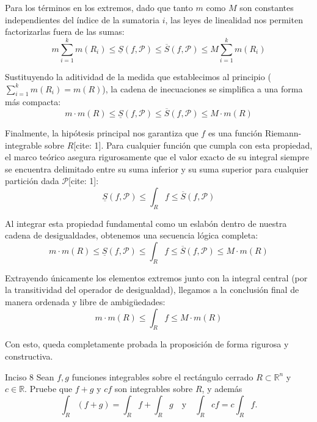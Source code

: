 \documentclass[11pt,letterpaper]{article}
\begin{document}
Para los términos en los extremos, dado que tanto $m$ como $M$ son constantes independientes del índice de la sumatoria $i$, las leyes de linealidad nos permiten factorizarlas fuera de las sumas:
\begin{equation*}
m \sum_{i=1}^{k} m(R_{i}) \le \underline{S}(f,\mathcal{P}) \le \overline{S}(f,\mathcal{P}) \le M \sum_{i=1}^{k} m(R_{i})
\end{equation*}

Sustituyendo la aditividad de la medida que establecimos al principio ($\sum_{i=1}^{k} m(R_{i}) = m(R)$), la cadena de inecuaciones se simplifica a una forma más compacta:
\begin{equation*}
m \cdot m(R) \le \underline{S}(f,\mathcal{P}) \le \overline{S}(f,\mathcal{P}) \le M \cdot m(R)
\end{equation*}

Finalmente, la hipótesis principal nos garantiza que $f$ es una función Riemann-integrable sobre $R$[cite: 1]. Para cualquier función que cumpla con esta propiedad, el marco teórico asegura rigurosamente que el valor exacto de su integral siempre se encuentra delimitado entre su suma inferior y su suma superior para cualquier partición dada $\mathcal{P}$[cite: 1]:
\begin{equation*}
\underline{S}(f,\mathcal{P}) \le \int_{R}f \le \overline{S}(f,\mathcal{P})
\end{equation*}

Al integrar esta propiedad fundamental como un eslabón dentro de nuestra cadena de desigualdades, obtenemos una secuencia lógica completa:
\begin{equation*}
m \cdot m(R) \le \underline{S}(f,\mathcal{P}) \le \int_{R}f \le \overline{S}(f,\mathcal{P}) \le M \cdot m(R)
\end{equation*}

Extrayendo únicamente los elementos extremos junto con la integral central (por la transitividad del operador de desigualdad), llegamos a la conclusión final de manera ordenada y libre de ambigüedades:
\begin{equation*}
m \cdot m(R) \le \int_{R}f \le M \cdot m(R)
\end{equation*}

Con esto, queda completamente probada la proposición de forma rigurosa y constructiva.

\begin{inciso}{Inciso 8}
Sean $f,g$ funciones integrables sobre el rectángulo cerrado $R\subset\mathbb{R}^{n}$ y $c\in\mathbb{R}.$ Pruebe que $f+g$ y $cf$ son integrables sobre $R$, y además
\begin{equation*}
    \int_{R}(f+g)=\int_{R}f+\int_{R}g \quad \text{y} \quad \int_{R}cf=c\int_{R}f.
\end{equation*}
\end{inciso}
\end{document}
